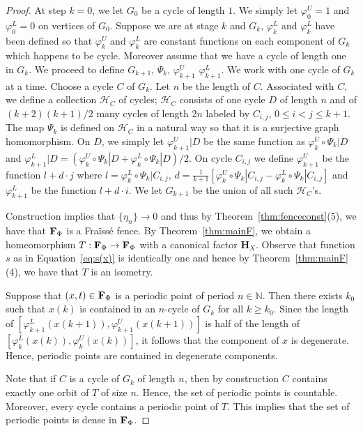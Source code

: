 \documentclass[11pt]{amsart}
\newcommand{\fence}{{\bf F}_{\Phi}{}}
\newcommand{\homeocantor}{{\mathbf H}_{X}}
\begin{document}
{\begin{proof}
    At step $k=0$, we let  $G_0$ be a cycle of length $1$. We simply let $\varphi^U_0 =1$ and $\varphi^L_0 =0$ on vertices of $G_0$.   Suppose we are at stage $k$ and $G_k$, $\varphi^L_k$ and $\varphi^L_k$ have been defined so that $\varphi^U_k$ and $\varphi^L_k$ are constant functions on each component of $G_k$ which happens to be cycle. Moreover assume that we have a cycle of length one in $G_k$. We proceed to define $G_{k+1}$, $\Psi_k$, $\varphi^U_{k+1}$ $\varphi^L_{k+1}$. We work with one cycle of $G_k$ at a time. Choose a cycle $C$ of $G_k$. Let $n$ be the length of $C$. Associated with $C$, we define a collection $\mathcal H _C$ of cycles; $\mathcal H_C$ consists of one cycle $D$ of length $n$ and of $(k+2)(k+1)/2$ many cycles of length $2n$ labeled by $C_{i,j}$, $0  \le i < j \le k+1$.
    The map $\Psi_k$ is defined on ${\mathcal H}_C$ in a natural way so that it is a surjective graph homomorphism. 
    On $D$, we simply let $\varphi^U_{k+1}|D$ be the same function as $\varphi^U_k \circ \Psi_k|D$ and $\varphi^L_{k+1}|D=(\varphi^U_k\circ\Psi_k|D + \varphi^L_k\circ \Psi_k|D)/2$. 
    On cycle $C_{i,j}$ we define $\varphi^U_{k+1}$ be the function $l+d\cdot j$ where $l= \varphi_k^L\circ \Psi_k|C_{i, j}$, $d = \frac{1}{k+1} [\varphi_k^U\circ \Psi_k|C_{i,j}-\varphi_k^L\circ \Psi_k|C_{i,j}] $
and $\varphi^L_{k+1}$ be the function $l+d\cdot i$.
We let $G_{k+1}$ be the union of all such $\mathcal{H}_C$'s.

Construction implies that $\{\eta_n\}\to 0$ and thus by Theorem~\ref{thm:fenceconst}(5), we have that $\fence$ is a Fra\"iss\'e fence. By Theorem~\ref{thm:mainF}, we obtain a homeomorphism $T:\fence\to \fence$ with a canonical factor $\homeocantor$. Observe that function $s$ as in Equation~\eqref{eq:s(x)} is identically one and hence by Theorem~\ref{thm:mainF}(4), we have that $T$ is an isometry.


Suppose that $(x,t)\in \fence$ is a periodic point of period $n\in\mathbb N$. Then there exists $k_0$ such that  $x(k)$ is contained in an $n$-cycle of $G_k$ for all $k\geq k_0$. Since the length of \newline $[\varphi^L_{k+1}(x({k+1})), \varphi^U_{k+1}(x({k+1}))]$ is half of the length of $ [\varphi^L_{k}(x(k)), \varphi^U_{k}(x(k))]$, it follows that the component of $x$ is degenerate. Hence, periodic points are contained in degenerate components.

Note that if $C$ is a cycle of $G_k$ of length $n$, then by construction $C$ contains exactly one orbit of $T$ of size $n$. Hence, the set of periodic points is countable. Moreover, every cycle contains a periodic point of $T$. This implies that the set of periodic points is dense in $\fence$.
\end{proof}

}
\end{document}
